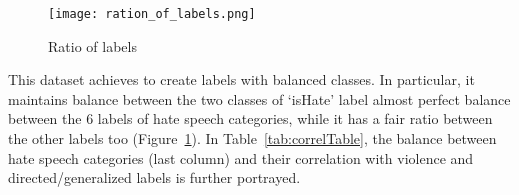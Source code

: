 \documentclass[sigconf]{acmart}
\begin{document}
\begin{figure}[ht]
\centering
\texttt{[image: ration\_of\_labels.png]}
\caption{Ratio of labels}
\label{fig:isHateLabels}
\end{figure}

This dataset achieves to create labels with balanced classes. In particular, it maintains balance between the two classes of `isHate' label almost perfect balance between the 6 labels of hate speech categories, while it has a fair ratio between the other labels too (Figure~\ref{fig:isHateLabels}). In Table~\ref{tab:correlTable}, the balance between hate speech categories (last column) and their correlation with violence and directed/generalized labels is further portrayed.

\begin{table}[ht]
\centering
{}
\caption{Correlation of HS categories with violence (V)/not violence (nV) and directed (D)/generalized (G) labels}
\label{tab:correlTable}
\end{table}
\end{document}
